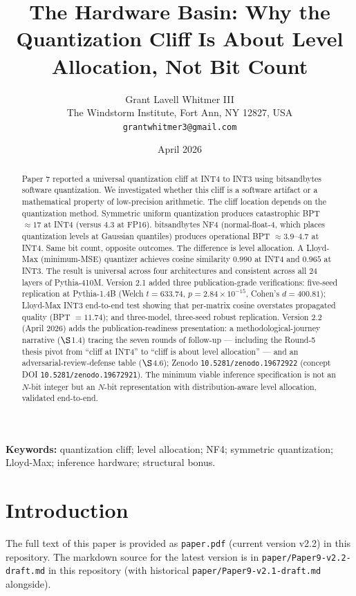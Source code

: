 \documentclass[12pt,a4paper]{article}
\title{The Hardware Basin: Why the Quantization Cliff Is About Level Allocation, Not Bit Count}
\author{Grant Lavell Whitmer III\\
The Windstorm Institute, Fort Ann, NY 12827, USA\\
\texttt{grantwhitmer3@gmail.com}}
\date{April 2026}
\begin{document}
\maketitle

\begin{abstract}
Paper 7 reported a universal quantization cliff at INT4 to INT3 using bitsandbytes software quantization. We investigated whether this cliff is a software artifact or a mathematical property of low-precision arithmetic. The cliff location depends on the quantization method. Symmetric uniform quantization produces catastrophic BPT $\approx 17$ at INT4 (versus $4.3$ at FP16). bitsandbytes NF4 (normal-float-4, which places quantization levels at Gaussian quantiles) produces operational BPT $\approx 3.9$--$4.7$ at INT4. Same bit count, opposite outcomes. The difference is level allocation. A Lloyd-Max (minimum-MSE) quantizer achieves cosine similarity $0.990$ at INT4 and $0.965$ at INT3. The result is universal across four architectures and consistent across all 24 layers of Pythia-410M. Version 2.1 added three publication-grade verifications: five-seed replication at Pythia-1.4B (Welch $t = 633.74$, $p = 2.84 \times 10^{-15}$, Cohen's $d = 400.81$); Lloyd-Max INT3 end-to-end test showing that per-matrix cosine overstates propagated quality (BPT $= 11.74$); and three-model, three-seed robust replication. Version 2.2 (April 2026) adds the publication-readiness presentation: a methodological-journey narrative ($\S$1.4) tracing the seven rounds of follow-up --- including the Round-5 thesis pivot from ``cliff at INT4'' to ``cliff is about level allocation'' --- and an adversarial-review-defense table ($\S$4.6); Zenodo \texttt{10.5281/zenodo.19672922} (concept DOI \texttt{10.5281/zenodo.19672921}). The minimum viable inference specification is not an $N$-bit integer but an $N$-bit representation with distribution-aware level allocation, validated end-to-end.
\end{abstract}

\noindent\textbf{Keywords:} quantization cliff; level allocation; NF4; symmetric quantization; Lloyd-Max; inference hardware; structural bonus.

\section{Introduction}

The full text of this paper is provided as \texttt{paper.pdf} (current version v2.2) in this repository. The markdown source for the latest version is in \texttt{paper/Paper9-v2.2-draft.md} in this repository (with historical \texttt{paper/Paper9-v2.1-draft.md} alongside).
\end{document}
